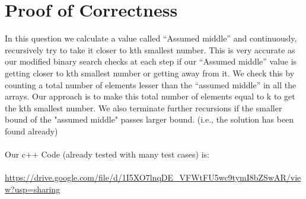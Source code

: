 \documentclass{article}
\begin{document}
\section{Proof of Correctness}
In this question we calculate a value called “Assumed middle” and continuously, recursively try to take it closer to kth smallest number. This is very accurate as our modified binary search checks at each step if our “Assumed middle” value is getting closer to kth smallest number or getting away from it. We check this by counting a total number of elements lesser than the “assumed middle” in all the arrays. Our approach is to make this total number of elements equal to k to get the kth smallest number. We also terminate further recursions if the smaller bound of the "assumed middle" passes larger bound. (i.e., the solution has been found already)
\\\\
Our c++ Code (already tested with many test cases) is:
\\\\
\url{https://drive.google.com/file/d/1I5XO7lnqDE_VFWtFU5wc9tymI8bZSwAR/view?usp=sharing}
\end{document}
